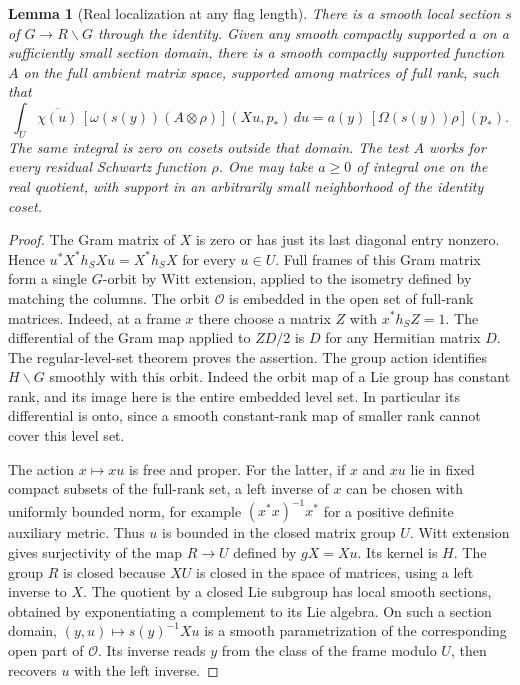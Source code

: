 \documentclass[a4paper,11pt]{article}
\newtheorem{lemma}[proposition]{Lemma}
\theoremstyle{definition}
\theoremstyle{remark}
\numberwithin{equation}{section}
\begin{document}
\begin{lemma}[Real localization at any flag length]\leavevmode
\label{lem:realflag265}
There is a smooth local section \(s\) of \(G\to R\backslash G\)
through the identity. Given any smooth compactly supported
\(a\) on a sufficiently small section domain, there is a
smooth compactly supported function \(A\) on the full ambient
matrix space, supported among matrices of full rank, such that
\[
 \int_U\overline{\chi(u)}\,
       [\omega(s(y))(A\otimes\rho)](Xu,p_*)\,du
     =a(y)\,[\Omega(s(y))\rho](p_*) .
\]
The same integral is zero on cosets outside that domain.
The test \(A\) works for every residual Schwartz function
\(\rho\). One may take \(a\ge0\) of integral one on the real
quotient, with support in an arbitrarily small neighborhood
of the identity coset.
\end{lemma}
\begin{proof}
The Gram matrix of \(X\) is zero or has just its last diagonal
entry nonzero. Hence \(u^*X^*h_SXu=X^*h_SX\) for every \(u\in U\).
Full frames of this Gram matrix form a single \(G\)-orbit by
Witt extension, applied to the isometry defined by matching
the columns. The orbit \(\mathcal O\) is embedded in the open
set of full-rank matrices. Indeed, at a frame \(x\) there choose
a matrix \(Z\) with \(x^*h_SZ=1\). The differential of the Gram
map applied to \(ZD/2\) is \(D\) for any Hermitian matrix \(D\).
The regular-level-set theorem proves the assertion. The group
action identifies \(H\backslash G\) smoothly with this orbit.
Indeed the orbit map of a Lie group has constant rank, and its image
here is the entire embedded level set. In particular its
differential is onto, since a smooth constant-rank map of
smaller rank cannot cover this level set.

The action \(x\mapsto xu\) is free and proper. For the latter,
if \(x\) and \(xu\) lie in fixed compact subsets of the
full-rank set, a left inverse of \(x\) can be chosen with
uniformly bounded norm, for example \((x^*x)^{-1}x^*\) for a
positive definite auxiliary metric. Thus \(u\) is bounded
in the closed matrix group \(U\). Witt extension gives
surjectivity of the map \(R\to U\) defined by \(gX=Xu\).
Its kernel is \(H\).
The group \(R\) is closed because \(XU\) is closed in the
space of matrices, using a left inverse to \(X\).
The quotient by a closed Lie subgroup has local smooth
sections, obtained by exponentiating a complement to its Lie
algebra. On such a section domain, \((y,u)\mapsto s(y)^{-1}Xu\)
is a smooth parametrization of the corresponding open part of
\(\mathcal O\). Its inverse reads \(y\) from the class of the
frame modulo \(U\), then recovers \(u\) with the left inverse.


\end{proof}
\end{document}
